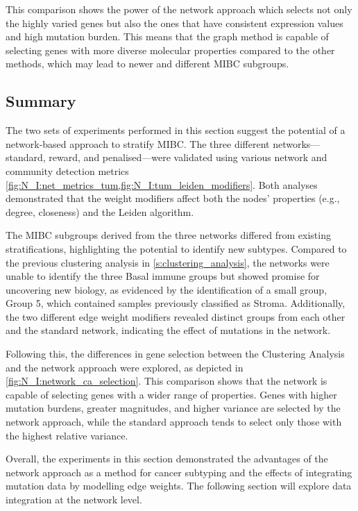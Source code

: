 This comparison shows the power of the network approach which selects not only the highly varied genes but also the ones that have consistent expression values and high mutation burden. This means that the graph method is capable of selecting genes with more diverse molecular properties compared to the other methods, which may lead to newer and different MIBC subgroups.

\subsection{Summary}

The two sets of experiments performed in this section suggest the potential of a network-based approach to stratify MIBC. The three different networks—standard, reward, and penalised—were validated using various network and community detection metrics \cref{fig:N_I:net_metrics_tum,fig:N_I:tum_leiden_modifiers}. Both analyses demonstrated that the weight modifiers affect both the nodes' properties (e.g., degree, closeness) and the Leiden algorithm.

The MIBC subgroups derived from the three networks differed from existing stratifications, highlighting the potential to identify new subtypes. Compared to the previous clustering analysis in \cref{s:clustering_analysis}, the networks were unable to identify the three Basal immune groups but showed promise for uncovering new biology, as evidenced by the identification of a small group, Group 5, which contained samples previously classified as Stroma. Additionally, the two different edge weight modifiers revealed distinct groups from each other and the standard network, indicating the effect of mutations in the network.

Following this, the differences in gene selection between the Clustering Analysis and the network approach were explored, as depicted in \cref{fig:N_I:network_ca_selection}. This comparison shows that the network is capable of selecting genes with a wider range of properties. Genes with higher mutation burdens, greater magnitudes, and higher variance are selected by the network approach, while the standard approach tends to select only those with the highest relative variance.

Overall, the experiments in this section demonstrated the advantages of the network approach as a method for cancer subtyping and the effects of integrating mutation data by modelling edge weights. The following section will explore data integration at the network level.
